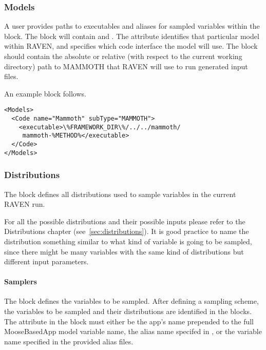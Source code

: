 \subsubsection{Models}
A user provides paths to executables and aliases for sampled variables within the
 block.  The  block will contain  and
.  The attribute  identifies that particular  model within RAVEN, and
 specifies which code interface the model will use. The 
block should contain the absolute or relative (with respect to the current working
directory) path to MAMMOTH that RAVEN will use to run generated input
files.

An example  block follows.

\begin{lstlisting}[style=XML]
<Models>
  <Code name="Mammoth" subType="MAMMOTH">
    <executable>\%FRAMEWORK_DIR\%/../../mammoth/
     mammoth-%METHOD%</executable>
  </Code>
</Models>
\end{lstlisting}

\subsubsection{Distributions}
The  block defines all distributions used to
sample variables in the current RAVEN run.

For all the possible distributions and their possible inputs please
refer to the Distributions chapter (see~\ref{sec:distributions}).
%
It is good practice to name the distribution something similar to what kind of
variable is going to be sampled, since there might be many variables with the
same kind of distributions but different input parameters.

\paragraph{Samplers}
The  block defines the variables to be sampled.
After defining a sampling scheme, the variables to be sampled and
their distributions are identified in the  blocks.
The  attribute in the  block must either be the
app's name prepended to the full MooseBasedApp model variable name, the alias name specifed in
, or the variable name specified in the provided alias files.

